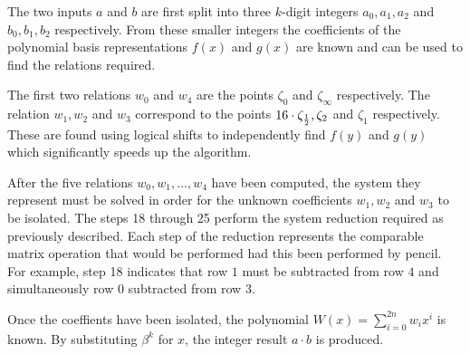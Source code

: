 \documentclass[b5paper]{book}
\begin{document}
The two inputs $a$ and $b$ are first split into three $k$-digit integers $a_0, a_1, a_2$ and $b_0, b_1, b_2$ respectively.  From these smaller
integers the coefficients of the polynomial basis representations $f(x)$ and $g(x)$ are known and can be used to find the relations required.

The first two relations $w_0$ and $w_4$ are the points $\zeta_{0}$ and $\zeta_{\infty}$ respectively.  The relation $w_1, w_2$ and $w_3$ correspond
to the points $16 \cdot \zeta_{1 \over 2}, \zeta_{2}$ and $\zeta_{1}$ respectively.  These are found using logical shifts to independently find
$f(y)$ and $g(y)$ which significantly speeds up the algorithm.

After the five relations $w_0, w_1, \ldots, w_4$ have been computed, the system they represent must be solved in order for the unknown coefficients 
$w_1, w_2$ and $w_3$ to be isolated.  The steps 18 through 25 perform the system reduction required as previously described.  Each step of
the reduction represents the comparable matrix operation that would be performed had this been performed by pencil.  For example, step 18 indicates
that row $1$ must be subtracted from row $4$ and simultaneously row $0$ subtracted from row $3$.  

Once the coeffients have been isolated, the polynomial $W(x) = \sum_{i=0}^{2n} w_i x^i$ is known.  By substituting $\beta^{k}$ for $x$, the integer 
result $a \cdot b$ is produced.
\end{document}
